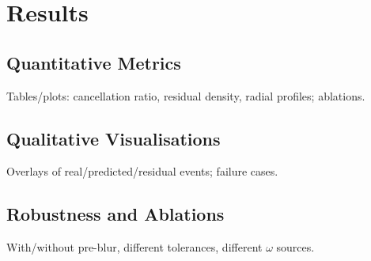 \chapter{Results}\label{chap:results}

\section{Quantitative Metrics}
Tables/plots: cancellation ratio, residual density, radial profiles; ablations.

\section{Qualitative Visualisations}
Overlays of real/predicted/residual events; failure cases.

\section{Robustness and Ablations}
With/without pre-blur, different tolerances, different \(\omega\) sources.
